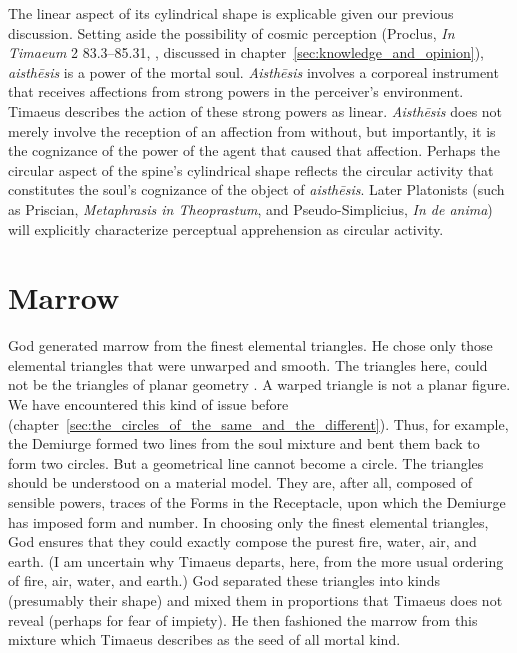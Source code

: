 The linear aspect of its cylindrical shape is explicable given our previous discussion. Setting aside the possibility of cosmic perception (Proclus, \emph{In Timaeum} 2 83.3–85.31, \citealt{Diehl:1903re}, discussed in chapter~\ref{sec:knowledge_and_opinion}), \emph{aisthēsis} is a power of the mortal soul. \emph{Aisthēsis} involves a corporeal instrument that receives affections from strong powers in the perceiver's environment. Timaeus describes the action of these strong powers as linear. \emph{Aisthēsis} does not merely involve the reception of an affection from without, but importantly, it is the cognizance of the power of the agent that caused that affection. Perhaps the circular aspect of the spine's cylindrical shape reflects the circular activity that constitutes the soul's cognizance of the object of \emph{aisthēsis}. Later Platonists (such as Priscian, \emph{Metaphrasis in Theoprastum}, and Pseudo-Simplicius, \emph{In de anima}) will explicitly characterize perceptual apprehension as circular activity.


\section{Marrow} %
\label{sec:marrow}

God generated marrow from the finest elemental triangles. He chose only those elemental triangles that were unwarped and smooth. The triangles here, could not be the triangles of planar geometry \citep[293 n2]{Cornford:1935fk}. A warped triangle is not a planar figure. We have encountered this kind of issue before (chapter~\ref{sec:the_circles_of_the_same_and_the_different}). Thus, for example, the Demiurge formed two lines from the soul mixture and bent them back to form two circles. But a geometrical line cannot become a circle. The triangles should be understood on a material model. They are, after all, composed of sensible powers, traces of the Forms in the Receptacle, upon which the Demiurge has imposed form and number. In choosing only the finest elemental triangles, God ensures that they could exactly compose the purest fire, water, air, and earth. (I am uncertain why Timaeus departs, here, from the more usual ordering of fire, air, water, and earth.) God separated these triangles into kinds (presumably their shape) and mixed them in proportions that Timaeus does not reveal (perhaps for fear of impiety). He then fashioned the marrow from this mixture which Timaeus describes as the seed of all mortal kind. 

